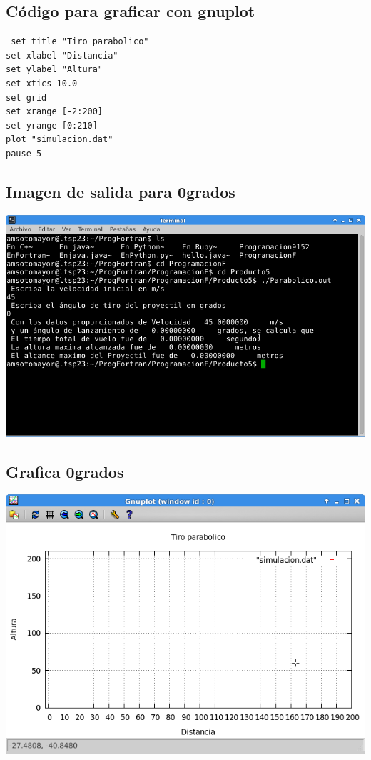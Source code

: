 \documentclass[letterpaper,10pt,twoside,onecolumn]{article}
\begin{document}
\subsection{Código para graficar con gnuplot}
\begin{verbatim} 
 set title "Tiro parabolico"
set xlabel "Distancia"
set ylabel "Altura"
set xtics 10.0
set grid 
set xrange [-2:200]
set yrange [0:210]
plot "simulacion.dat" 
pause 5
\end{verbatim}

\subsection{Imagen de salida para 0grados}

\includegraphics[scale=.40]{salida0g.png}

\subsection{Grafica 0grados}

\includegraphics[scale=.50]{grafica0g.png}
\end{document}
